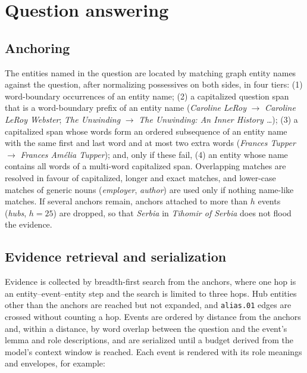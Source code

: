 \documentclass[preprint,12pt,authoryear]{elsarticle}
\begin{document}
\section{Question answering}
\label{sec:qa}

\subsection{Anchoring}

The entities named in the question are located by matching graph entity names against the question, after normalizing possessives on both sides, in four tiers:
(1) word-boundary occurrences of an entity name;
(2) a capitalized question span that is a word-boundary prefix of an entity name (\textit{Caroline LeRoy} $\to$ \textit{Caroline LeRoy Webster}; \textit{The Unwinding} $\to$ \textit{The Unwinding: An Inner History \ldots});
(3) a capitalized span whose words form an ordered subsequence of an entity name with the same first and last word and at most two extra words (\textit{Frances Tupper} $\to$ \textit{Frances Am\'elia Tupper});
and, only if these fail, (4) an entity whose name contains all words of a multi-word capitalized span.
Overlapping matches are resolved in favour of capitalized, longer and exact matches, and lower-case matches of generic nouns (\textit{employer}, \textit{author}) are used only if nothing name-like matches.
If several anchors remain, anchors attached to more than $h$ events (\emph{hubs}, $h = 25$) are dropped, so that \textit{Serbia} in \textit{Tihomir of Serbia} does not flood the evidence.

\subsection{Evidence retrieval and serialization}

Evidence is collected by breadth-first search from the anchors, where one hop is an entity--event--entity step and the search is limited to three hops.
Hub entities other than the anchors are reached but not expanded, and \texttt{alias.01} edges are crossed without counting a hop.
Events are ordered by distance from the anchors and, within a distance, by word overlap between the question and the event's lemma and role descriptions, and are serialized until a budget derived from the model's context window is reached.
Each event is rendered with its role meanings and envelopes, for example:
\end{document}
